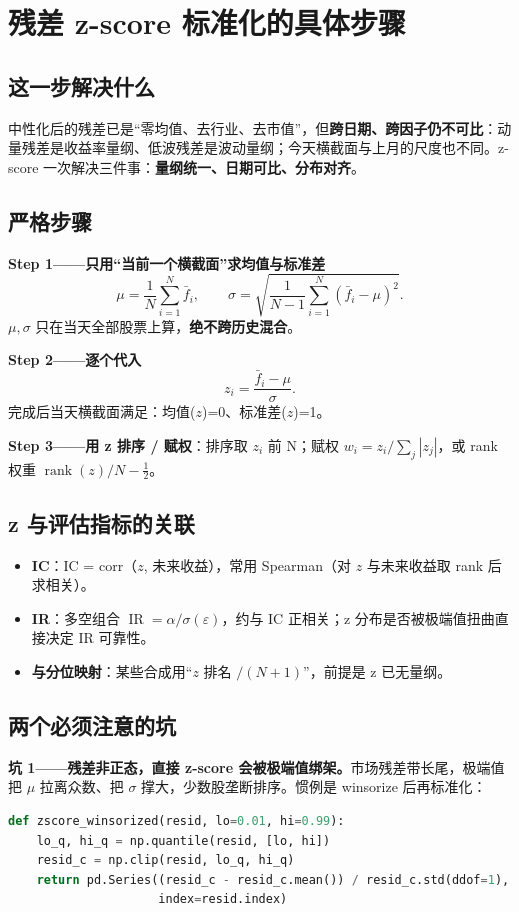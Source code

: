 \documentclass[UTF8,11pt]{ctexart}
\begin{document}
\section{残差 z-score 标准化的具体步骤}

\subsection{这一步解决什么}
中性化后的残差已是“零均值、去行业、去市值”，但\textbf{跨日期、跨因子仍不可比}：动量残差是收益率量纲、低波残差是波动量纲；今天横截面与上月的尺度也不同。z-score 一次解决三件事：\textbf{量纲统一、日期可比、分布对齐}。

\subsection{严格步骤}
\textbf{Step 1——只用“当前一个横截面”求均值与标准差}
\begin{equation}
\mu=\frac1N\sum_{i=1}^{N}\bar f_i,\qquad
\sigma=\sqrt{\frac{1}{N-1}\sum_{i=1}^{N}(\bar f_i-\mu)^2}.
\end{equation}
$\mu,\sigma$ 只在当天全部股票上算，\textbf{绝不跨历史混合}。

\textbf{Step 2——逐个代入}
\begin{equation}
z_i = \frac{\bar f_i-\mu}{\sigma}.
\end{equation}
完成后当天横截面满足：均值($z$)=0、标准差($z$)=1。

\textbf{Step 3——用 z 排序 / 赋权}：排序取 $z_i$ 前 N；赋权 $w_i=z_i/\sum_j|z_j|$，或 rank 权重 $\operatorname{rank}(z)/N-\tfrac12$。

\subsection{z 与评估指标的关联}
\begin{itemize}[itemsep=2pt]
\item \textbf{IC}：IC = corr（$z$, 未来收益），常用 Spearman（对 $z$ 与未来收益取 rank 后求相关）。
\item \textbf{IR}：多空组合 $\operatorname{IR}=\alpha/\sigma(\varepsilon)$，约与 IC 正相关；z 分布是否被极端值扭曲直接决定 IR 可靠性。
\item \textbf{与分位映射}：某些合成用“$z$ 排名 $/(N+1)$”，前提是 z 已无量纲。
\end{itemize}

\subsection{两个必须注意的坑}
\textbf{坑 1——残差非正态，直接 z-score 会被极端值绑架。}市场残差带长尾，极端值把 $\mu$ 拉离众数、把 $\sigma$ 撑大，少数股垄断排序。惯例是 winsorize 后再标准化：
\begin{lstlisting}[language=Python]
def zscore_winsorized(resid, lo=0.01, hi=0.99):
    lo_q, hi_q = np.quantile(resid, [lo, hi])
    resid_c = np.clip(resid, lo_q, hi_q)
    return pd.Series((resid_c - resid_c.mean()) / resid_c.std(ddof=1),
                     index=resid.index)
\end{lstlisting}
\end{document}
